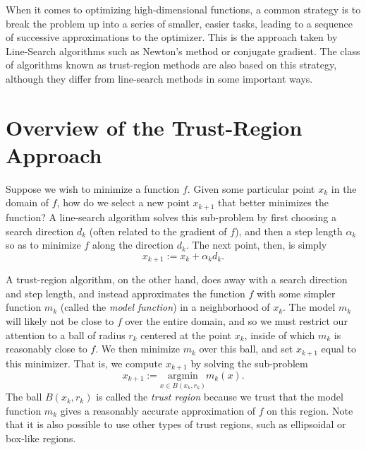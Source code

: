 \label{lab:trust_region}


When it comes to optimizing high-dimensional functions, a common strategy is to break
the problem up into a series of smaller, easier tasks, leading to a sequence of
successive approximations to the optimizer. This is the approach taken by Line-Search
algorithms such as Newton's method or conjugate gradient.
The class of algorithms known as trust-region methods are also based on this
strategy, although they differ from line-search methods in some important ways.

\section*{Overview of the Trust-Region Approach}
Suppose we wish to minimize a function $f$.
Given some particular point $x_k$ in the domain of $f$, how do we
select a new point $x_{k+1}$ that better minimizes the function? A line-search
algorithm solves this sub-problem by first choosing a search direction $d_k$
(often related to the gradient of $f$), and then a step length $\alpha_k$ so
as to minimize $f$ along the direction $d_k$. The next point, then, is simply
\[
x_{k+1} := x_k + \alpha_k d_k.
\]

A trust-region algorithm, on the other hand, does away with a search direction and
step length, and instead approximates the function $f$ with some simpler function
$m_k$ (called the \emph{model function}) in a neighborhood of $x_k$. 
The model $m_k$ will likely not be close to $f$ over the entire
domain, and so we must restrict our attention to a ball of radius $r_k$ centered at
the point $x_k$, inside of which $m_k$ is reasonably close to $f$. We then minimize
$m_k$ over this ball, and set $x_{k+1}$ equal to this minimizer. That is, we compute $x_{k+1}$ by
solving the sub-problem
\[
x_{k+1} := \underset{x \in B(x_k, r_k)}{\text{argmin}} m_k(x).
\]
The ball $B(x_k, r_k)$ is called the \emph{trust region} because we trust that the
model function $m_k$ gives a reasonably accurate approximation of $f$ on this region.
Note that it is also possible to use other types of trust regions, such as
ellipsoidal or box-like regions.

